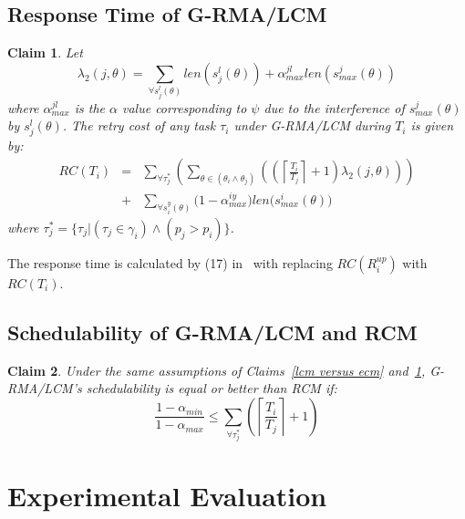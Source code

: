 \documentclass[letter]{sig-alternate}
\newtheorem{clm}{Claim}
\begin{document}
\subsection{Response Time of G-RMA/LCM}
\label{rma}

\begin{clm}\label{response g-rma/lcm}
Let 
\begin{equation*}
\lambda_{2}(j,\theta) = \sum_{\forall s_{j}^{l}(\theta)}len(s_{j}^{l}(\theta))+\alpha_{max}^{jl}len(s_{max}^{j}(\theta))
\end{equation*}
 where $\alpha_{max}^{jl}$ is the $\alpha$ value corresponding to $\psi$ due to the interference of $s_{max}^j(\theta)$ by $s_j^l(\theta)$. The retry cost of any task $\tau_i$ under G-RMA/LCM during $T_i$ 
is given by:
\begin{eqnarray}
RC\left(T_i\right) & = &
  \sum_{\forall \tau_{j}^{*}}\left(\sum_{\theta\in(\theta_{i}\wedge\theta_{j})}\left(\left(\left\lceil\frac{T_i}{T_{j}}\right\rceil +1\right)\lambda_{2}(j,\theta)\right)\right)\nonumber\\
& + & \sum_{\forall s_{i}^{y}(\theta)}\Big(1-\alpha_{max}^{iy}\Big)len\Big(s_{max}^i(\theta)\Big)
\label{eq60}
\end{eqnarray}
where $\tau_{j}^{*}=\{\tau_{j}|(\tau_{j}\in\gamma_{i})\wedge(p_{j}>p_{i})\}$.
\end{clm}

The response time is calculated by (17) in~\cite{stmconcurrencycontrol:emsoft11} with replacing $RC(R_i^{up})$ with $RC(T_i)$.

\subsection{Schedulability of G-RMA/LCM and RCM}
\label{rma eval}

\begin{clm}\label{rma_eval_clm}
Under the same assumptions of Claims~\ref{lcm versus ecm} and~\ref{response g-rma/lcm}, G-RMA/LCM's schedulability is equal or better than RCM if:
\begin{equation}
\frac{1-\alpha_{min}}{1-\alpha_{max}}\le \sum_{\forall \tau_j^*}\left( \left\lceil\frac{T_i}{T_j}\right\rceil +1 \right)
\label{eq70}\end{equation}
\end{clm}

\section{Experimental Evaluation}\label{exp_eval}
\end{document}
